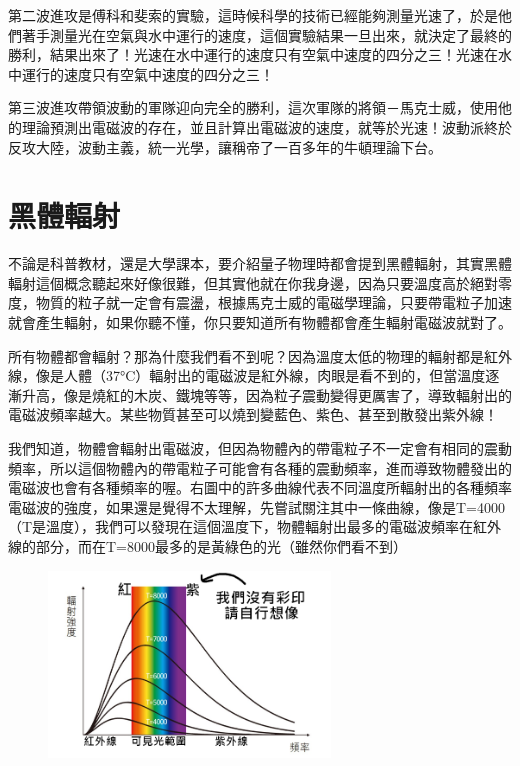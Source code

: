 第二波進攻是傅科和斐索的實驗，這時候科學的技術已經能夠測量光速了，於是他們著手測量光在空氣與水中運行的速度，這個實驗結果一旦出來，就決定了最終的勝利，結果出來了！光速在水中運行的速度只有空氣中速度的四分之三！光速在水中運行的速度只有空氣中速度的四分之三！

第三波進攻帶領波動的軍隊迎向完全的勝利，這次軍隊的將領－馬克士威，使用他的理論預測出電磁波的存在，並且計算出電磁波的速度，就等於光速！波動派終於反攻大陸，波動主義，統一光學，讓稱帝了一百多年的牛頓理論下台。

\section{黑體輻射}
不論是科普教材，還是大學課本，要介紹量子物理時都會提到黑體輻射，其實黑體輻射這個概念聽起來好像很難，但其實他就在你我身邊，因為只要溫度高於絕對零度，物質的粒子就一定會有震盪，根據馬克士威的電磁學理論，只要帶電粒子加速就會產生輻射，如果你聽不懂，你只要知道所有物體都會產生輻射電磁波就對了。
\begin{tcolorbox}[breakable, title={專欄：輻射函數圖}, before upper={\parindent2em}, parbox=false]

所有物體都會輻射？那為什麼我們看不到呢？因為溫度太低的物理的輻射都是紅外線，像是人體（37°C）輻射出的電磁波是紅外線，肉眼是看不到的，但當溫度逐漸升高，像是燒紅的木炭、鐵塊等等，因為粒子震動變得更厲害了，導致輻射出的電磁波頻率越大。某些物質甚至可以燒到變藍色、紫色、甚至到散發出紫外線！

我們知道，物體會輻射出電磁波，但因為物體內的帶電粒子不一定會有相同的震動頻率，所以這個物體內的帶電粒子可能會有各種的震動頻率，進而導致物體發出的電磁波也會有各種頻率的喔。右圖中的許多曲線代表不同溫度所輻射出的各種頻率電磁波的強度，如果還是覺得不太理解，先嘗試關注其中一條曲線，像是T=4000（T是溫度），我們可以發現在這個溫度下，物體輻射出最多的電磁波頻率在紅外線的部分，而在T=8000最多的是黃綠色的光（雖然你們看不到）

\begin{figure}[H]
\centering
\graphicspath{{physics/}}
\includegraphics[width=7.5cm, center]{radiation.png}
\label{fig:rad}
\end{figure}
\end{tcolorbox}

